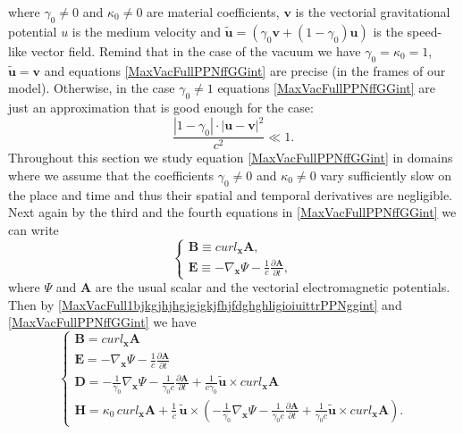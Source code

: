 \documentclass{article}
\theoremstyle{definition}
\theoremstyle{remark}
\renewcommand{\vec}[1]{\mathbf{#1}}
\newcommand{\er}{\eqref}
\newcommand{\er}{\eqref}
\begin{document}
%
%
%
where $\gamma_0\neq 0$ and $\kappa_0\neq 0$ are material
coefficients, $\vec v$ is the vectorial gravitational potential $u$
is the medium velocity and $\vec {\tilde u}=\left(\gamma_0\vec
v+(1-\gamma_0)\vec u\right)$ is the speed-like vector field. Remind
that in the case of the vacuum we have $\gamma_0=\kappa_0=1$, $\vec
{\tilde u}=\vec v$ and equations \er{MaxVacFullPPNffGGint} are
precise (in the frames of our model). Otherwise, in the case
$\gamma_0\neq 1$ equations \er{MaxVacFullPPNffGGint} are just an
approximation that is good enough for the case:
\begin{equation}\label{OprdddsimGGffyhjyhhtygrffgfzzjjjint}
\frac{|1-\gamma_0|\cdot|\vec u-\vec v|^2}{c^2}\ll 1.
\end{equation}
Throughout this section we study equation \er{MaxVacFullPPNffGGint}
in domains where we assume that the coefficients $\gamma_0\neq 0$
and $\kappa_0\neq 0$ vary sufficiently slow on the place and time
and thus their spatial and temporal derivatives are negligible. Next
again by the third and the fourth equations in
\er{MaxVacFullPPNffGGint} we can write
\begin{equation}\label{MaxVacFull1bjkgjhjhgjgjgkjfhjfdghghligioiuittrPPNggint}
\begin{cases}
\vec B\equiv curl_{\vec x} \vec A,\\
\vec E\equiv-\nabla_{\vec x}\Psi-\frac{1}{c}\frac{\partial\vec
A}{\partial t},
\end{cases}
\end{equation}
where $\Psi$ and $\vec A$ are the usual scalar and the vectorial
electromagnetic potentials. Then by
\er{MaxVacFull1bjkgjhjhgjgjgkjfhjfdghghligioiuittrPPNggint} and
\er{MaxVacFullPPNffGGint} we have
\begin{equation}\label{vhfffngghPPN333yuyuGGint}
\begin{cases}
\vec B= curl_{\vec x} \vec A\\
\vec E=-\nabla_{\vec x}\Psi-\frac{1}{c}\frac{\partial\vec
A}{\partial t}\\
 \vec D=-\frac{1}{\gamma_0}\nabla_{\vec
x}\Psi-\frac{1}{\gamma_0 c}\frac{\partial\vec A}{\partial t}+\frac{1}{c\gamma_0}\vec {\tilde u}\times curl_{\vec x}\vec A\\
\vec H= \kappa_0 \,curl_{\vec x} \vec A+\frac{1}{c}\,\vec {\tilde
u}\times\left(-\frac{1}{\gamma_0}\nabla_{\vec
x}\Psi-\frac{1}{\gamma_0 c}\frac{\partial\vec A}{\partial
t}+\frac{1}{\gamma_0 c}\vec {\tilde u}\times curl_{\vec x}\vec
A\right).
\end{cases}
\end{equation}
\end{document}
